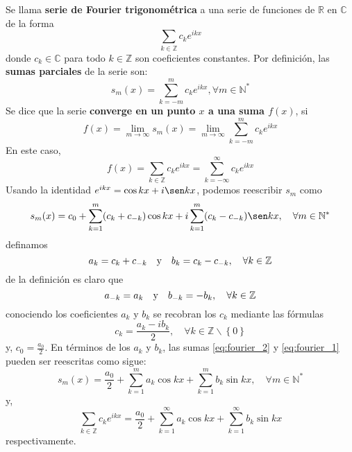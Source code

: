 \documentclass[12pt]{report}
\newcounter{it}
\theoremstyle{largebreak}
\begin{document}
    \begin{mydef}
        Se llama \textbf{serie de Fourier trigonométrica} a una serie de funciones de $\mathbb{R}$ en $\mathbb{C}$ de la forma
        \begin{equation}
            \sum_{k\in\mathbb{Z}}c_k e^{ ikx}
            \label{eq:fourier_1}
        \end{equation}
        donde $c_k\in\mathbb{C}$ para todo $k\in\mathbb{Z}$ son coeficientes constantes. Por definición, las \textbf{sumas parciales} de la serie son:
        \begin{equation*}
            s_m(x)=\sum_{ k=-m}^{m} c_{k}e^{ikx},\forall m\in\mathbb{N}^*
        \end{equation*}
        Se dice que la serie \textbf{converge en un punto $x$ a una suma $f(x)$}, si
        \begin{equation*}
            f(x)=\lim_{ m\rightarrow\infty}s_m(x)=\lim_{ m\rightarrow\infty}\sum_{ k=-m}^m c_k e^{ikx }
        \end{equation*}
        En este caso,
        \begin{equation*}
            f(x)=\sum_{ k\in\mathbb{Z}}c_ke^{ ikx}=\sum_{ k=-\infty}^\infty c_ke^{ ikx}
        \end{equation*}
        Usando la identidad $e^{ ikx}=\cos kx+i\sen kx$, podemos reescribir $s_m$ como
        \begin{equation}
            s_m(x)=c_0+\sum_{ k=1}^m(c_k+c_{ -k})\cos kx+i\sum_{ k=1}^m(c_k-c_{ -k})\sen kx,\quad\forall m\in\mathbb{N}^*
            \label{eq:fourier_2}
        \end{equation}
        definamos
        \begin{equation}
            a_k=c_k+c_{ -k}\quad\textup{y}\quad b_k=c_k-c_{ -k},\quad\forall k\in\mathbb{Z}
            \label{eq:coef_fourier_1}
        \end{equation}
        de la definición es claro que
        \begin{equation*}
            a_{ -k}=a_k\quad\textup{y}\quad b_{-k}=-b_k,\quad\forall k\in\mathbb{Z}
        \end{equation*}
        conociendo los coeficientes $a_k$ y $b_k$ se recobran los $c_k$ mediante las fórmulas
        \begin{equation}
            c_k=\frac{a_k-ib_k}{2},\quad\forall k\in\mathbb{Z}\backslash\left\{0 \right\}
            \label{eq:coef_fourier_2}
        \end{equation}
        y, $c_0=\frac{a_0}{2}$. En términos de los $a_k$ y $b_k$, las sumas \ref{eq:fourier_2} y \ref{eq:fourier_1} pueden ser reescritas como sigue:
        \begin{equation}
            s_m(x)=\frac{a_0}{2}+\sum_{ k=1}^m a_k\cos kx+\sum_{ k=1}^m b_k\sin kx,\quad\forall m\in\mathbb{N}^*
            \label{eq:fourier_3}
        \end{equation}
        y,
        \begin{equation}
            \sum_{k\in\mathbb{Z}}c_k e^{ ikx}=\frac{a_0}{2}+\sum_{ k=1}^\infty a_k\cos kx+\sum_{ k=1}^\infty b_k\sin kx
            \label{eq:fourier_4}
        \end{equation}
        respectivamente.
    \end{mydef}
\end{document}
